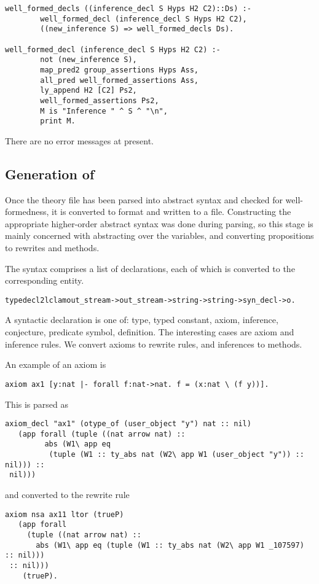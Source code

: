 \begin{verbatim}
well_formed_decls ((inference_decl S Hyps H2 C2)::Ds) :-
        well_formed_decl (inference_decl S Hyps H2 C2),
        ((new_inference S) => well_formed_decls Ds).

well_formed_decl (inference_decl S Hyps H2 C2) :-
        not (new_inference S),
        map_pred2 group_assertions Hyps Ass,
        all_pred well_formed_assertions Ass,
        ly_append H2 [C2] Ps2,
        well_formed_assertions Ps2,
        M is "Inference " ^ S ^ "\n",
        print M.
\end{verbatim}
There are no error messages at present.

\subsection{Generation of \lclam}\label{generation}
Once the theory file has been parsed into abstract syntax and checked
for well-formedness, it is converted to \lclam format and written to a
file. Constructing the appropriate higher-order abstract syntax was
done during parsing, so this stage is mainly concerned with
abstracting over the variables, and converting propositions to
rewrites and methods.

The syntax comprises a list of declarations, each of which is
converted to the corresponding \lclam entity.

\begin{alltt}
% decl2lclam {\it +sig-file +mod-file +theory-name +logic-name +declaration}

type decl2lclam  out_stream -> out_stream -> string -> string -> syn_decl -> o.
\end{alltt}
A syntactic declaration is one of: type, typed constant, axiom,
inference, conjecture, predicate symbol, definition.  The interesting
cases are axiom and inference rules. We convert axioms to rewrite
rules, and inferences to methods.

An example of an axiom is
\begin{verbatim}
axiom ax1 [y:nat |- forall f:nat->nat. f = (x:nat \ (f y))].
\end{verbatim}
This is parsed as
\begin{verbatim}
axiom_decl "ax1" (otype_of (user_object "y") nat :: nil) 
   (app forall (tuple ((nat arrow nat) :: 
         abs (W1\ app eq 
          (tuple (W1 :: ty_abs nat (W2\ app W1 (user_object "y")) :: nil))) ::
 nil)))
\end{verbatim}
and converted to the rewrite rule
\begin{verbatim}
axiom nsa ax11 ltor (trueP) 
   (app forall 
     (tuple ((nat arrow nat) :: 
       abs (W1\ app eq (tuple (W1 :: ty_abs nat (W2\ app W1 _107597) :: nil)))
 :: nil))) 
    (trueP).
\end{verbatim}


